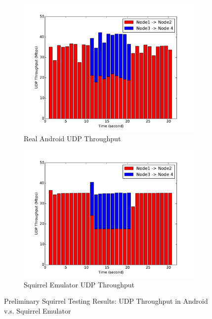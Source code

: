\documentclass[12pt]{report}
\begin{document}
\begin{figure}[h]
  \begin{center}
    \begin{subfigure}[h]{0.48\textwidth}
      \includegraphics[width=\textwidth]{figures/squirrel/android.pdf}
      \caption{\label{fig:squirrel_preliminary_android}Real Android UDP Throughput}
    \end{subfigure}
    \begin{subfigure}[h]{0.48\textwidth}
      \includegraphics[width=\textwidth]{figures/squirrel/squirrel.pdf}
      \caption{\label{fig:squirrel_preliminary_squirrel}Squirrel Emulator UDP Throughput}
    \end{subfigure}
    \caption{\label{fig:squirrel_preliminary}Preliminary Squirrel Testing Results: UDP Throughput in Android v.s. Squirrel Emulator}
  \end{center}
\end{figure}
\end{document}
